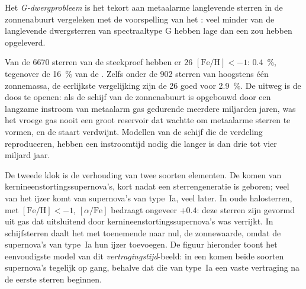 \begin{definition}[G-dwergprobleem]\label{def:b3:origin-of-elements:g-dwarf}
Het \emph{G-dwergprobleem} is het tekort aan
metaalarme langlevende sterren in de zonnenabuurt vergeleken met de
voorspelling van het : veel minder van de langlevende dwergsterren
van spectraaltype G hebben lage  dan een  zou
hebben opgeleverd.
\end{definition}

Van de 6670 sterren van de steekproef hebben er 26 $[\mathrm{Fe/H}] < -1$:
\qty{0.4}{\percent}, tegenover de \qty{16}{\percent} van de .
Zelfs onder de 902 sterren van hoogstens één zonnemassa, de eerlijkste
vergelijking zijn de 26 goed voor \qty{2.9}{\percent}. De uitweg is de
doos te openen: als de schijf van de zonnenabuurt is opgebouwd door een langzame
instroom van metaalarm gas gedurende meerdere miljarden jaren, was het vroege gas nooit
een groot reservoir dat wachtte om metaalarme sterren te vormen, en de staart
verdwijnt. Modellen van de schijf die de verdeling reproduceren, hebben een
instroomtijd nodig die langer is dan drie tot vier miljard jaar.

De tweede klok is de verhouding van twee soorten elementen. De 
komen van kernineenstortingssupernova's, kort nadat een sterrengeneratie
is geboren; veel van het ijzer komt van supernova's van type~Ia,
veel later. In oude halosterren, met $[\mathrm{Fe/H}] < -1$,
$[\alpha/\mathrm{Fe}]$ bedraagt ongeveer $+0.4$: deze sterren zijn gevormd uit gas
dat uitsluitend door kernineenstortingssupernova's was verrijkt. In schijfsterren daalt het met
toenemende  naar nul, de zonnewaarde, omdat de supernova's van type~Ia
hun ijzer toevoegen. De figuur hieronder toont het eenvoudigste model
van dit \emph{vertragingstijd}-beeld: in een  komen beide soorten
supernova's tegelijk op gang, behalve dat die van type~Ia een vaste
vertraging na de eerste sterren beginnen.

